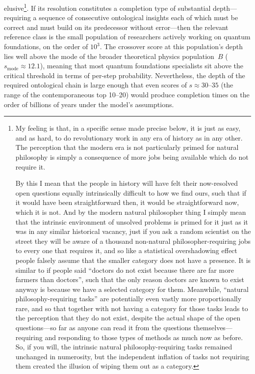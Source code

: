 \documentclass{article}
\begin{document}
elusive\footnote{My feeling is that, in a specific sense made precise below, it is just as easy, and as hard, to do revolutionary work in any era of history as in any other. The perception that the modern era is not particularly primed for natural philosophy is simply a consequence of more jobs being available which do not require it.\par
By this I mean that the people in history will have felt their now-resolved open questions equally intrinsically difficult to how we find ours, such that if it would have been straightforward then, it would be straightforward now, which it is not. And by the modern natural philosopher thing I simply mean that the intrinsic environment of unsolved problems is primed for it just as it was in any similar historical vacancy, just if you ask a random scientist on the street they will be aware of a thousand non-natural philosopher-requiring jobs to every one that requires it, and so like a statistical overshadowing effect people falsely assume that the smaller category does not have a presence. It is similar to if people said ``doctors do not exist because there are far more farmers than doctors'', such that the only reason doctors are known to exist anyway is because we have a selected category for them. Meanwhile, ``natural philosophy-requiring tasks'' are potentially even vastly more proportionally rare, and so that together with not having a category for those tasks leads to the perception that they do not exist, despite the actual shape of the open questions---so far as anyone can read it from the questions themselves---requiring and responding to those types of methods as much now as before. So, if you will, the intrinsic natural philosophy-requiring tasks remained unchanged in numerosity, but the independent inflation of tasks not requiring them created the illusion of wiping them out as a category.}. If its resolution constitutes a completion type of substantial
depth---requiring a sequence of consecutive ontological insights each of
which must be correct and must build on its predecessor without
error---then the relevant reference class is the small population of
researchers actively working on quantum foundations, on the order of
$10^3$. The crossover score at this population's depth lies well above the mode of
the broader theoretical physics population~$B$
($s_{\mathrm{mode}} \approx 12.1$), meaning that most quantum
foundations specialists sit above the critical threshold in terms of
per-step probability. Nevertheless, the depth of the required
ontological chain is large enough that even scores of $s \approx 30$--$35$
(the range of the contemporaneous top 10--20) would produce completion
times on the order of billions of years under the model's assumptions.
\end{document}
